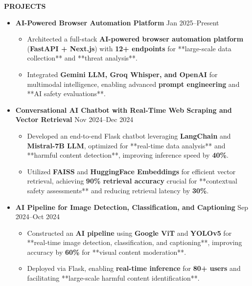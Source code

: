 \documentclass[a4paper,10pt]{article}
\newcommand{\resheading}[1]{%
  \vspace{1em}%
  \noindent\colorbox{mygrey}{%
    \parbox{\dimexpr\linewidth-2\fboxsep\relax}{%
      \textbf{#1}%
    }%
  }%
  \vspace{0.6em}%
}
\begin{document}
\resheading{PROJECTS}
\vspace{0.4em}
\begin{itemize}
  \item \textbf{AI-Powered Browser Automation Platform} \hfill Jan 2025–Present
  \begin{itemize}
    \item Architected a full-stack \textbf{AI-powered browser automation platform} (\textbf{FastAPI + Next.js}) with \textbf{12+ endpoints} for **large-scale data collection** and **threat analysis**.
    \item Integrated \textbf{Gemini LLM, Groq Whisper, and OpenAI} for multimodal intelligence, enabling advanced \textbf{prompt engineering} and **AI safety evaluations**.
  \end{itemize}

  \item \textbf{Conversational AI Chatbot with Real-Time Web Scraping and Vector Retrieval} \hfill Nov 2024–Dec 2024
  \begin{itemize}
    \item Developed an end-to-end Flask chatbot leveraging \textbf{LangChain} and \textbf{Mistral-7B LLM}, optimized for **real-time data analysis** and **harmful content detection**, improving inference speed by \textbf{40\%}.
    \item Utilized \textbf{FAISS} and \textbf{HuggingFace Embeddings} for efficient vector retrieval, achieving \textbf{90\% retrieval accuracy} crucial for **contextual safety assessments** and reducing retrieval latency by \textbf{30\%}.
  \end{itemize}

  \item \textbf{AI Pipeline for Image Detection, Classification, and Captioning} \hfill Sep 2024–Oct 2024
  \begin{itemize}
    \item Constructed an \textbf{AI pipeline} using \textbf{Google ViT} and \textbf{YOLOv5} for **real-time image detection, classification, and captioning**, improving accuracy by \textbf{60\%} for **visual content moderation**.
    \item Deployed via Flask, enabling \textbf{real-time inference} for \textbf{80+ users} and facilitating **large-scale harmful content identification**.
  \end{itemize}
\end{itemize}
\end{document}
